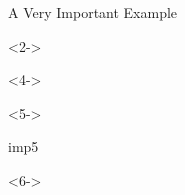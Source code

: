\def\EMtitlesize{26}\def\EMtitleskip{31}
\begin{frame}{A Very Important Example}
\begin{minipage}[t]{500bp}\vspace{0pt}
\begin{uncoverenv}<2->
\end{uncoverenv}
\EMgap
\EMgap
\begin{uncoverenv}<4->
\end{uncoverenv}
\EMgap
\begin{uncoverenv}<5->
\end{uncoverenv}
\EMgap
\begin{EMbox}{imp}{5}{}
\begin{uncoverenv}<6->
\end{uncoverenv}
\end{EMbox}
\end{minipage}
\end{frame}

